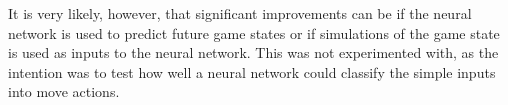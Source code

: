 It is very likely, however, that significant improvements can be if the neural network is used to predict future game states or if simulations of the game state is used as inputs to the neural network. This was not experimented with, as the intention was to test how well a neural network could classify the simple inputs into move actions.